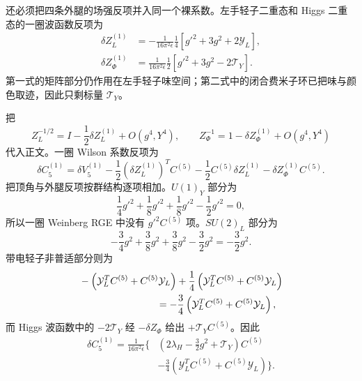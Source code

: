 \begin{derivation}
还必须把四条外腿的场强反项并入同一个裸系数。左手轻子二重态和 Higgs 二重态的一圈波函数反项为
\begin{align*}
 \delta Z_L^{(1)}
 &=-\frac{1}{16\pi^2\epsilon}\frac14
 \left[g'^2+3g^2+2\mathcal Y_L\right],\\
 \delta Z_\Phi^{(1)}
 &=\frac{1}{16\pi^2\epsilon}\frac12
 \left[g'^2+3g^2-2\mathcal T_Y\right].
\end{align*}
第一式的矩阵部分仍作用在左手轻子味空间；第二式中的闭合费米子环已把味与颜色取迹，因此只剩标量 $\mathcal T_Y$。

把
\begin{equation*}
 Z_L^{-1/2}=I-\frac12\delta Z_L^{(1)}+O(g^4,Y^4),
 \qquad
 Z_\Phi^{-1}=1-\delta Z_\Phi^{(1)}+O(g^4,Y^4)
\end{equation*}
代入正文。一圈 Wilson 系数反项为
\begin{equation*}
 \delta C_5^{(1)}
 =\delta V_5^{(1)}
 -\frac12(\delta Z_L^{(1)})^T C^{(5)}
 -\frac12C^{(5)}\delta Z_L^{(1)}
 -\delta Z_\Phi^{(1)}C^{(5)}.
\end{equation*}
把顶角与外腿反项按群结构逐项相加。$U(1)_Y$ 部分为
\begin{equation*}
 \frac14g'^2
 +\frac18g'^2+\frac18g'^2
 -\frac12g'^2=0,
\end{equation*}
所以一圈 Weinberg RGE 中没有 $g'^2C^{(5)}$ 项。$SU(2)_L$ 部分为
\begin{equation*}
 -\frac34g^2
 +\frac38g^2+\frac38g^2
 -\frac32g^2
 =-\frac32g^2.
\end{equation*}
带电轻子非普适部分则为
\begin{align*}
 &-\left(\mathcal Y_L^TC^{(5)}+C^{(5)}\mathcal Y_L\right)
 +\frac14\left(\mathcal Y_L^TC^{(5)}+C^{(5)}\mathcal Y_L\right)\\
 &\hspace{28mm}
 =-\frac34\left(\mathcal Y_L^TC^{(5)}+C^{(5)}\mathcal Y_L\right),
\end{align*}
而 Higgs 波函数中的 $-2\mathcal T_Y$ 经 $-\delta Z_\Phi$ 给出 $+\mathcal T_YC^{(5)}$。因此
\begin{align*}
 \delta C_5^{(1)}
 =\frac{1}{16\pi^2\epsilon}
 \Bigg\{&
 \left(2\lambda_H-\frac32g^2+\mathcal T_Y\right)C^{(5)}\\
 &-\frac34\left(\mathcal Y_L^TC^{(5)}+C^{(5)}\mathcal Y_L\right)
 \Bigg\}.
\end{align*}


\end{derivation}
